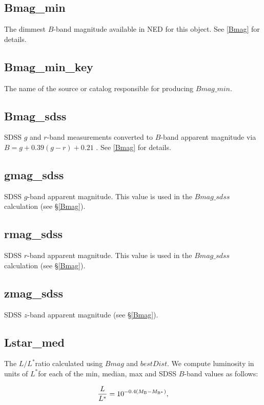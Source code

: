 \documentclass[twocolumn,tighten]{aastex62}
\newcommand{\Lstar}{$L^*$}
\begin{document}
\subsection{Bmag\_min}
The dimmest $B$-band magnitude available in NED for this object. See \ref{Bmag} for details.

\subsection{Bmag\_min\_key}
The name of the source or catalog responsible for producing $Bmag\_min$.

\subsection{Bmag\_sdss} \label{Bmag_sdss}
SDSS $g$ and $r$-band measurements converted to $B$-band apparent magnitude via $B = g + 0.39 (g-r) + 0.21$ \citep{jester2005}. See \ref{Bmag} for details.

\subsection{gmag\_sdss}
SDSS $g$-band apparent magnitude. This value is used in the $Bmag\_sdss$ calculation (see \S \ref{Bmag}).

\subsection{rmag\_sdss}
SDSS $r$-band apparent magnitude. This value is used in the $Bmag\_sdss$ calculation (see \S \ref{Bmag}).

\subsection{zmag\_sdss}
SDSS $z$-band apparent magnitude (see \S \ref{Bmag}).

\subsection{Lstar\_med} \label{Lstar_med}
The $L / $\Lstar ratio calculated using $Bmag$ and $bestDist$. We compute luminosity in units of \Lstar for each of the min, median, max and SDSS $B$-band values as follows:

\begin{equation}
	\frac{L}{L^*} = 10^{-0.4 (M_{\rm B} - M_{\rm B^{*}})},
	\label{lstar}
\end{equation}
\end{document}
